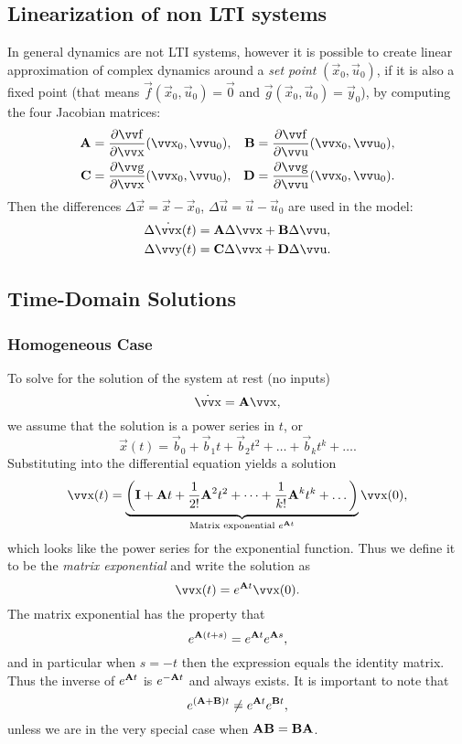 \subsection{Linearization of non LTI systems}

In general dynamics are not LTI systems, however it is possible to create linear approximation of complex dynamics around a \emph{set point} \((\vec{x}_0, \vec{u}_0)\), if it is also a fixed point (that means \(\vec{f}(\vec{x}_0, \vec{u}_0) = \vec{0}\) and \(\vec{g}(\vec{x}_0, \vec{u}_0) = \vec{y}_0\)), by computing the four Jacobian matrices:
\begin{align*}
	\mx{A} &= \frac{\partial\vec{f}}{\partial\vec{x}} (\vec{x}_0, \vec{u}_0), &
	\mx{B} &= \frac{\partial\vec{f}}{\partial\vec{u}} (\vec{x}_0, \vec{u}_0), \\
	\mx{C} &= \frac{\partial\vec{g}}{\partial\vec{x}} (\vec{x}_0, \vec{u}_0), &
	\mx{D} &= \frac{\partial\vec{g}}{\partial\vec{u}} (\vec{x}_0, \vec{u}_0).
\end{align*}
Then the differences \(\Delta\vec{x} = \vec{x} - \vec{x}_0\), \(\Delta\vec{u} = \vec{u} - \vec{u}_0\) are used in the model:
\begin{align*}
	\Delta\dot{\vec{x}}(t) & = \mx{A} \Delta\vec{x} + \mx{B} \Delta\vec{u}, \\
	\Delta\vec{y}(t)       & = \mx{C} \Delta\vec{x} + \mx{D} \Delta\vec{u}.
\end{align*}

\subsection{Time-Domain Solutions}

\subsubsection{Homogeneous Case}

To solve for the solution of the system at rest (no inputs)
\[
	\dot{\vec{x}} = \mx{A} \vec{x},
\]
we assume that the solution is a power series in \(t\), or
\[
	\vec{x}(t) = \vec{b}_0 + \vec{b}_1 t + \vec{b}_2 t^2 + \dots + \vec{b}_k t^k + \dots.
\]
Substituting into the differential equation yields a solution
\[
	\vec{x}(t) = \underbrace{\left(
		\mx{I} + \mx{A} t + \frac{1}{2!} \mx{A}^2 t^2 + \dots
		+ \frac{1}{k!} \mx{A}^k t^k + \dots
	\right)}_{\text{Matrix exponential } e^{\mx{A}t}} \vec{x}(0),
\]
which looks like the power series for the exponential function. Thus we define it to be the \emph{matrix exponential} and write the solution as
\[
	\vec{x}(t) = e^{\mx{A}t} \vec{x}(0).
\]
The matrix exponential has the property that
\[
	e^{\bm{\mathrm{A}}(t + s)} = e^{\bm{\mathrm{A}}t} e^{\bm{\mathrm{A}}s},
\]
and in particular when \(s = -t\) then the expression equals the identity matrix. Thus the inverse of \(e^{\bm{\mathrm{A}}t}\) is \(e^{-\bm{\mathrm{A}}t}\) and always exists. It is important to note that
\[
	e^{(\bm{\mathrm{A}} + \bm{\mathrm{B}}) t} \neq e^{\bm{\mathrm{A}}t} e^{\bm{\mathrm{B}}t},
\]
unless we are in the very special case when \(\bm{\mathrm{A}}\bm{\mathrm{B}} = \bm{\mathrm{B}}\bm{\mathrm{A}}\).

